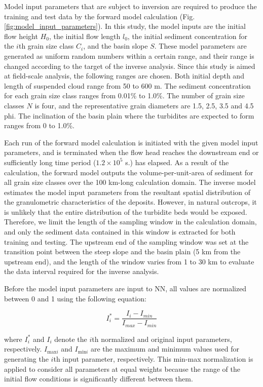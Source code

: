 Model input parameters that are subject to inversion are required to produce the training and test data by the forward model calculation (Fig. \ref{fig:model_input_parameters}). In this study, the model inputs are the initial flow height $H_0$, the initial flow length $l_0$, the initial sediment concentration for the $i$th grain size class $C_i$, and the basin slope $S$. These model parameters are generated as uniform random numbers within a certain range, and their range is changed according to the target of the inverse analysis. Since this study is aimed at field-scale analysis, the following ranges are chosen. Both initial depth and length of suspended cloud range from 50 to 600 m. The sediment concentration for each grain size class ranges from 0.01\% to 1.0\%. The number of grain size classes $N$ is four, and the representative grain diameters are 1.5, 2.5, 3.5 and 4.5 phi. The inclination of the basin plain where the turbidites are expected to form ranges from 0 to 1.0\%. 

Each run of the forward model calculation is initiated with the given model input parameters, and is terminated when the flow head reaches the downstream end or sufficiently long time period ($1.2 \times 10^5$ s.) has elapsed. As a result of the calculation, the forward model outputs the volume-per-unit-area of sediment for all grain size classes over the 100 km-long calculation domain. The inverse model estimates the model input parameters from the resultant spatial distribution of the granulometric characteristics of the deposits. However, in natural outcrops, it is unlikely that the entire distribution of the turbidite beds would be exposed. Therefore, we limit the length of the sampling window in the calculation domain, and only the sediment data contained in this window is extracted for both training and testing. The upstream end of the sampling window was set at the transition point between the steep slope and the basin plain (5 km from the upstream end), and the length of the window varies from 1 to 30 km to evaluate the data interval required for the inverse analysis.

Before the model input parameters are input to NN, all values are normalized between 0 and 1 using the following equation:

\begin{equation}
I_{i}^{*} = \frac{I_i - I_{min}}{I_{max} - I_{min}}
\label{eq:normalization}
\end{equation}

\noindent where $I_i^*$ and $I_i$ denote the $i$th normalized and original input parameters, respectively. $I_{\mathrm{max}i}$ and $I_{\mathrm{min}i}$ are the maximum and minimum values used for generating the $i$th input parameter, respectively. This min-max normalization is applied to consider all parameters at equal weights because the range of the initial flow conditions is significantly different between them.

